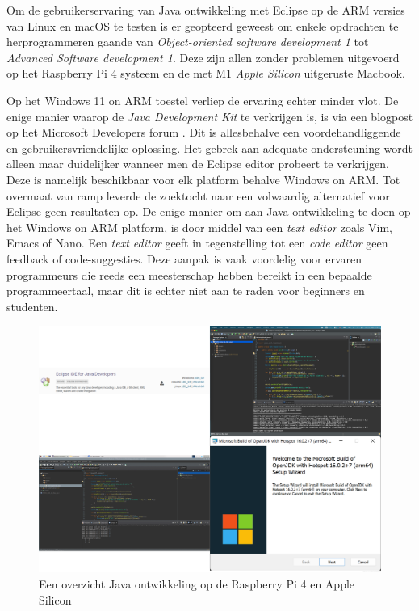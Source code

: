 Om de gebruikerservaring van Java ontwikkeling met Eclipse op de ARM versies van Linux en macOS te testen is er geopteerd geweest om enkele opdrachten te herprogrammeren gaande van \textit{Object-oriented software development 1} tot \textit{Advanced Software development 1}. Deze zijn allen zonder problemen uitgevoerd op het Raspberry Pi 4 systeem en de met M1 \textit{Apple Silicon} uitgeruste Macbook.

Op het Windows 11 on ARM toestel verliep de ervaring echter minder vlot. De enige manier waarop de \textit{Java Development Kit} te verkrijgen is, is via een blogpost op het 
Microsoft Developers forum \autocite{Borges2020}. Dit is allesbehalve een voordehandliggende en gebruikersvriendelijke oplossing. Het gebrek aan adequate ondersteuning wordt alleen maar duidelijker wanneer men de Eclipse editor probeert te verkrijgen. Deze is namelijk beschikbaar voor elk platform behalve Windows on ARM. Tot overmaat van ramp leverde de zoektocht naar een volwaardig alternatief voor Eclipse geen resultaten op. De enige manier om aan Java ontwikkeling te doen op het Windows on ARM platform, is door middel van een \textit{text editor} zoals Vim, Emacs of Nano. Een \textit{text editor} geeft in tegenstelling tot een \textit{code editor} geen feedback of code-suggesties. Deze aanpak is vaak voordelig voor ervaren programmeurs die reeds een meesterschap hebben bereikt in een bepaalde programmeertaal, maar dit is echter niet aan te raden voor beginners en studenten.

\begin{figure}[!h]
	\centering
	\includegraphics[width=\linewidth]{img/java_development.png}
	\caption{Een overzicht Java ontwikkeling op de Raspberry Pi 4 en Apple Silicon \autocite{EclipseFoundation2022}}
\end{figure}

